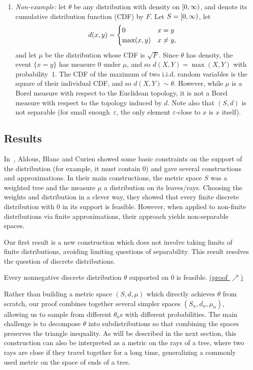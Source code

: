 \documentclass[AHL,Unicode]{cedram}
\newcommand*\eps{\varepsilon}
\newcommand*\nonnegative{\left[0,\infty\right)}
\let\originalleft\left
\let\originalright\right
\renewcommand{\left}{\mathopen{}\mathclose\bgroup\originalleft}
\renewcommand{\right}{\aftergroup\egroup\originalright}
\begin{document}
\begin{enumerate}
\item \emph{Non-example:} let $\theta$ be any distribution with density on $\nonnegative$, and denote its cumulative distribution function (CDF) by $F$. Let $S=\nonnegative$, let
\[
d\left(x,y\right)=
\begin{cases}
0 & x=y\\
\max\left(x,y\right) & x\neq y,
\end{cases}
\]
and let $\mu$ be the distribution whose CDF is $\sqrt{F}$. Since $\theta$ has density, the event $\{ x=y\} $ has measure $0$ under $\mu$, and so $d(X,Y)=\max(X,Y)$ with probability~$1$. The CDF of the maximum of two i.i.d. random variables is the square of their individual CDF, and so $d(X,Y)\sim\theta$. However, while $\mu$ is a Borel measure with respect to the Euclidean topology, it is not a Borel measure with respect to the topology induced by $d$. Note also that $(S,d)$ is not separable (for small enough~$\eps$, the only element $\eps$-close to $x$ is $x$ itself).
\end{enumerate}

\subsection{Results}

In~\cite{aldous_blanc_curien_distance_problem_2024}, Aldous, Blanc and Curien showed some basic constraints on the support of the distribution (for example, it must contain $0$) and gave several constructions and approximations. In their main constructions, the metric space $S$ was a weighted tree and the measure $\mu$ a distribution on its leaves/rays. Choosing the weights and distribution in a clever way, they showed that every finite discrete distribution with $0$ in its support is feasible. However, when applied to non-finite distributions via finite approximations, their approach yields non-separable spaces.

Our first result is a new construction which does not involve taking limits of finite distributions, avoiding limiting questions of separability. This result resolves the question of discrete distributions.

\begin{theo}\label{thm:discrete_distributions}
Every nonnegative discrete distribution $\theta$ supported on $0$ is feasible. \hyperlink{target:proof_of_discrete}{({proof $\nearrow$})}%
\end{theo}

Rather than building a metric space $(S,d,\mu)$ which directly achieves $\theta$ from scratch, our proof combines together several simpler spaces $(S_{n},d_{n},\mu_{n})$, allowing us to sample from different $\theta_{n}$s with different probabilities. The main challenge is to decompose $\theta$ into subdistributions so that combining the spaces preserves the triangle inequality. As will be described in the next section, this construction can also be interpreted as a metric on the rays of a tree, where two rays are close if they travel together for a long time, generalizing a commonly used metric on the space of ends of a tree.
\end{document}
